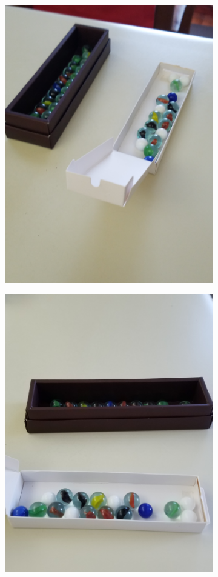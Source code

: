 \documentclass{article}
\begin{document}
\begin{figure}[H]
	\centering
	\begin{subfigure}{.5\textwidth}
		\centering
		\includegraphics[width=.9\linewidth,angle=-90]{photos/m1}
	\end{subfigure}%
	\begin{subfigure}{.5\textwidth}
		\centering
		\includegraphics[width=.9\linewidth,angle=-90]{photos/m2}

\end{subfigure}
\end{figure}
\end{document}
